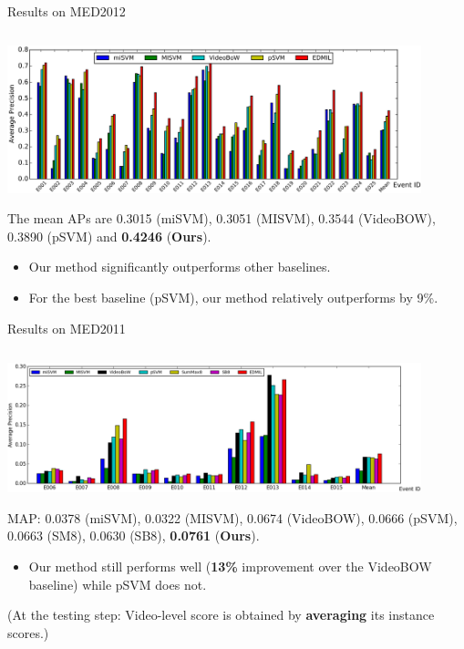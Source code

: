 \documentclass{beamer}
\begin{document}
\begin{frame}{Results on MED2012} 	
	\begin{center}
		\includegraphics[width=12cm,height=5cm]{images/part4/med12.png}
		\\
		\tiny{The mean APs are 0.3015 (miSVM), 0.3051 (MISVM), 0.3544 (VideoBOW), 0.3890 (pSVM) and \textbf{0.4246} (\textbf{Ours}).}
	\end{center}
	
	\begin{itemize}
		\item Our method significantly outperforms other baselines.
		\item For the best baseline (pSVM), our method relatively outperforms by 9\%. 	
	\end{itemize}
	
\end{frame}	

\begin{frame}{Results on MED2011} 	
	\begin{center}
		\includegraphics[width=12cm,height=4.5cm]{images/part4/sum_med11_2.png}
		\\
		\tiny{MAP: 0.0378 (miSVM), 0.0322 (MISVM), 0.0674 (VideoBOW), 0.0666 (pSVM), 0.0663 (SM8), 0.0630 (SB8), \textbf{0.0761} (\textbf{Ours}).}
	\end{center}
	
	\begin{itemize}
		\item Our method still performs well (\textbf{13\%} improvement over the VideoBOW baseline) while pSVM does not.
	\end{itemize}
(At the testing step: Video-level score is obtained by \textbf{averaging} its instance scores.)	
\end{frame}	
\end{document}
